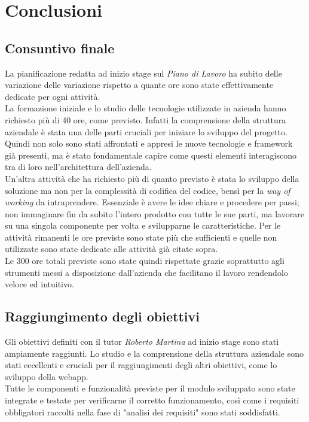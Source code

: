 \chapter{Conclusioni}
\label{cap:conclusioni}

\section{Consuntivo finale}
La pianificazione redatta ad inizio stage sul \textit{Piano di Lavoro} ha subito delle variazione delle variazione rispetto a quante ore sono state effettivamente dedicate per ogni attività.\\ La formazione iniziale e lo studio delle tecnologie utilizzate in azienda hanno richiesto più di 40 ore, come previsto. Infatti la comprensione della struttura aziendale è stata una delle parti cruciali per iniziare lo sviluppo del progetto. Quindi non solo sono stati affrontati e appresi le nuove tecnologie e framework già presenti, ma è stato fondamentale capire come questi elementi interagiscono tra di loro nell'architettura dell'azienda. \\
Un'altra attività che ha richiesto più di quanto previsto è stata lo sviluppo della soluzione ma non per la complessità di codifica del codice, bensì per la \textit{way of working} da intraprendere. Essenziale è avere le idee chiare e procedere per passi; non immaginare fin da subito l'intero prodotto con tutte le sue parti, ma lavorare su una singola componente per volta e svilupparne le caratteristiche. 
Per le attività rimanenti le ore previste sono state più che sufficienti e quelle non utilizzate sono state dedicate alle attività già citate sopra. \\
Le 300 ore totali previste sono state quindi rispettate grazie soprattutto agli strumenti messi a disposizione dall'azienda che facilitano il lavoro rendendolo veloce ed intuitivo.

\section{Raggiungimento degli obiettivi}
Gli obiettivi definiti con il tutor \textit{Roberto Martina} ad inizio stage sono stati ampiamente raggiunti. Lo studio e la comprensione della struttura aziendale sono stati eccellenti e cruciali per il raggiungimenti degli altri obiettivi, come lo sviluppo della webapp. \\
Tutte le componenti e funzionalità previste per il modulo sviluppato sono state integrate e testate per verificarne il corretto funzionamento, così come i requisiti obbligatori raccolti nella fase di "analisi dei requisiti" sono stati soddisfatti. 
\newpage
